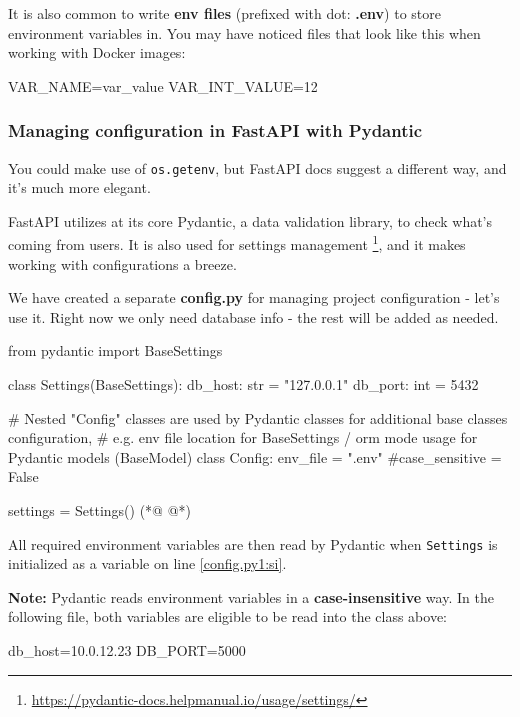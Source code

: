\documentclass{article}
\newcommand{\flink}[1]{\footnote{\href{#1}{#1}}}
\newcommand{\note}{\textbf{\color{red}Note: }}
\newcommand{\pyinline}[1]{\lstinline[language=Python, style=cstyle, morekeywords={async}, basicstyle=\ttfamily\normalsize]{#1}}
\begin{document}
It is also common to write \textbf{env files} (prefixed with dot: \textbf{.env}) to store environment variables in. You may have noticed files that look like this when working with Docker images:

\begin{bashcode}
    VAR_NAME=var_value
    VAR_INT_VALUE=12
\end{bashcode}

\subsubsection{Managing configuration in FastAPI with Pydantic \label{preparations:configenv}}

You could make use of \pyinline{os.getenv}, but FastAPI docs suggest a different way, and it's much more elegant.

FastAPI utilizes at its core Pydantic, a data validation library, to check what's coming from users. It is also used for settings management \flink{https://pydantic-docs.helpmanual.io/usage/settings/}, and it makes working with configurations a breeze.

We have created a separate \textbf{config.py} for managing project configuration - let's use it. Right now we only need database info - the rest will be added as needed.

\begin{pycode}
from pydantic import BaseSettings


class Settings(BaseSettings):
    db_host: str = "127.0.0.1"
    db_port: int = 5432

    # Nested "Config" classes are used by Pydantic classes for additional base classes configuration,
    # e.g. env file location for BaseSettings / orm mode usage for Pydantic models (BaseModel)
    class Config:
        env_file = ".env"
        #case_sensitive = False

settings = Settings() (*@ \label{config.py1:si} @*)
\end{pycode}

All required environment variables are then read by Pydantic when \pyinline{Settings} is initialized as a variable on line \ref{config.py1:si}.

\note Pydantic reads environment variables in a \textbf{case-insensitive} way. In the following file, both variables are eligible to be read into the class above:

\begin{bashcode}
db_host=10.0.12.23
DB_PORT=5000
\end{bashcode}
\end{document}
